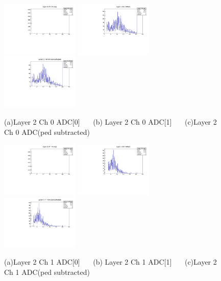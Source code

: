 \documentclass[a4paper,11pt]{article}
\theoremstyle{mytheor}
\begin{document}
\begin{figure}[H] 
\vspace*{-0.3cm} 
\includegraphics[width=0.33\textwidth,scale=0.5,trim=0 0 0 0,clip]{plotsdir/file0_muons-Layer2_Ch0_adc0-1.pdf} 
\includegraphics[width=0.33\textwidth,scale=0.5,trim=0 0 0 0,clip]{plotsdir/file0_muons-Layer2_Ch0_adc1-1.pdf} 
\includegraphics[width=0.33\textwidth,scale=0.5,trim=0 0 0 0,clip]{plotsdir/file0_muons-Layer2_Ch0_adcPedsub-1.pdf} 
\caption{(a)Layer 2 Ch 0 ADC[0] ~~~(b) Layer 2 Ch 0 ADC[1] ~~~(c)Layer 2 Ch 0 ADC(ped subtracted) } 
\end{figure} 
\begin{figure}[H] 
\vspace*{-0.3cm} 
\includegraphics[width=0.33\textwidth,scale=0.5,trim=0 0 0 0,clip]{plotsdir/file0_muons-Layer2_Ch1_adc0-1.pdf} 
\includegraphics[width=0.33\textwidth,scale=0.5,trim=0 0 0 0,clip]{plotsdir/file0_muons-Layer2_Ch1_adc1-1.pdf} 
\includegraphics[width=0.33\textwidth,scale=0.5,trim=0 0 0 0,clip]{plotsdir/file0_muons-Layer2_Ch1_adcPedsub-1.pdf} 
\caption{(a)Layer 2 Ch 1 ADC[0] ~~~(b) Layer 2 Ch 1 ADC[1] ~~~(c)Layer 2 Ch 1 ADC(ped subtracted) } 
\end{figure} 
\end{document}

